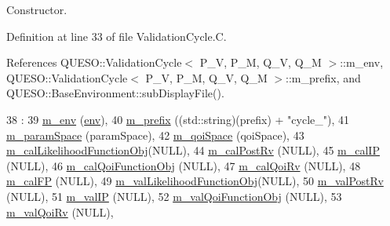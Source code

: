 Constructor. 



Definition at line 33 of file Validation\-Cycle.\-C.



References Q\-U\-E\-S\-O\-::\-Validation\-Cycle$<$ P\-\_\-\-V, P\-\_\-\-M, Q\-\_\-\-V, Q\-\_\-\-M $>$\-::m\-\_\-env, Q\-U\-E\-S\-O\-::\-Validation\-Cycle$<$ P\-\_\-\-V, P\-\_\-\-M, Q\-\_\-\-V, Q\-\_\-\-M $>$\-::m\-\_\-prefix, and Q\-U\-E\-S\-O\-::\-Base\-Environment\-::sub\-Display\-File().


\begin{DoxyCode}
38   :
39   \hyperlink{class_q_u_e_s_o_1_1_validation_cycle_a38a308718da67cac37c1290d86b93bb3}{m\_env}                     (\hyperlink{class_q_u_e_s_o_1_1_validation_cycle_a64215b434e018a2ef2f4049aa48ecc17}{env}),
40   \hyperlink{class_q_u_e_s_o_1_1_validation_cycle_adcc61017a11c99f3a6189ddbf7bc76fc}{m\_prefix}                  ((std::string)(prefix) + \textcolor{stringliteral}{"cycle\_"}),
41   \hyperlink{class_q_u_e_s_o_1_1_validation_cycle_a641d2e59aed41a93a787c71ec30b6e07}{m\_paramSpace}              (paramSpace),
42   \hyperlink{class_q_u_e_s_o_1_1_validation_cycle_adccd6175c04258a6f603a92a7ae4327c}{m\_qoiSpace}                (qoiSpace),
43   \hyperlink{class_q_u_e_s_o_1_1_validation_cycle_a764d9a79a615317b0749ee69c2234d40}{m\_calLikelihoodFunctionObj}(NULL),
44   \hyperlink{class_q_u_e_s_o_1_1_validation_cycle_a535b6447a44ac7191e12e887d1710ef0}{m\_calPostRv}               (NULL),
45   \hyperlink{class_q_u_e_s_o_1_1_validation_cycle_afa19cacc32a262840f2108ed405f0521}{m\_calIP}                   (NULL),
46   \hyperlink{class_q_u_e_s_o_1_1_validation_cycle_ab891acfabc02b5e590deee6e05e30b2c}{m\_calQoiFunctionObj}       (NULL),
47   \hyperlink{class_q_u_e_s_o_1_1_validation_cycle_ac3bac139c827b3210e92d4bac190f89f}{m\_calQoiRv}                (NULL),
48   \hyperlink{class_q_u_e_s_o_1_1_validation_cycle_ab91bdb2d36652abb6275af640f2844bd}{m\_calFP}                   (NULL),
49   \hyperlink{class_q_u_e_s_o_1_1_validation_cycle_a18afcde29c5ba9f4b7d9db9519166d45}{m\_valLikelihoodFunctionObj}(NULL),
50   \hyperlink{class_q_u_e_s_o_1_1_validation_cycle_a196610836330a456a21c4f3b6ec56883}{m\_valPostRv}               (NULL),
51   \hyperlink{class_q_u_e_s_o_1_1_validation_cycle_ad65609930305ca35305bb7b42b1acfad}{m\_valIP}                   (NULL),
52   \hyperlink{class_q_u_e_s_o_1_1_validation_cycle_a35443093bebe1ddbab7fa7cb671be562}{m\_valQoiFunctionObj}       (NULL),
53   \hyperlink{class_q_u_e_s_o_1_1_validation_cycle_a930f8140c5ba8655ea6ce926acc6ceef}{m\_valQoiRv}                (NULL),

\end{DoxyCode}
